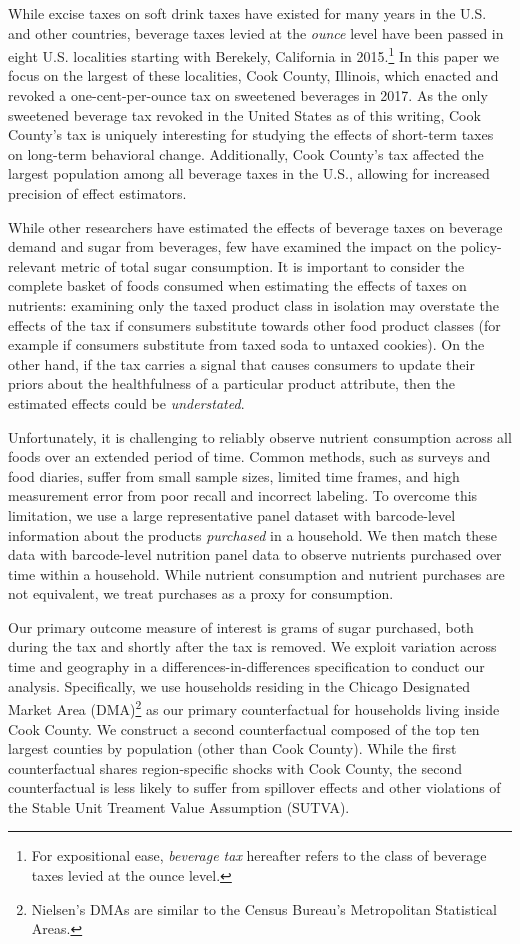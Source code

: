 \documentclass[12pt]{article}
\begin{document}
While excise taxes on soft drink taxes have existed for many years in the U.S. and other countries, beverage taxes levied at the \textit{ounce} level have been passed in eight U.S. localities starting with Berekely, California in 2015.\footnote{For expositional ease, \textit{beverage tax} hereafter refers to the class of beverage taxes levied at the ounce level.} In this paper we focus on the largest of these localities, Cook County, Illinois, which enacted and revoked a one-cent-per-ounce tax on sweetened beverages in 2017. As the only sweetened beverage tax revoked in the United States as of this writing, Cook County's tax is uniquely interesting for studying the effects of short-term taxes on long-term behavioral change. Additionally, Cook County's tax affected the largest population among all beverage taxes in the U.S., allowing for increased precision of effect estimators.

While other researchers have estimated the effects of beverage taxes on beverage demand and sugar from beverages, few have examined the impact on the policy-relevant metric of total sugar consumption. It is important to consider the complete basket of foods consumed when estimating the effects of taxes on nutrients: examining only the taxed product class in isolation may overstate the effects of the tax if consumers substitute towards other food product classes (for example if consumers substitute from taxed soda to untaxed cookies). On the other hand, if the tax carries a signal that causes consumers to update their priors about the healthfulness of a particular product attribute, then the estimated effects could be \textit{understated}.

Unfortunately, it is challenging to reliably observe nutrient consumption across all foods over an extended period of time. Common methods, such as surveys and food diaries, suffer from small sample sizes, limited time frames, and high measurement error from poor recall and incorrect labeling. To overcome this limitation, we use a large representative panel dataset with barcode-level information about the products \textit{purchased} in a household. We then match these data with barcode-level nutrition panel data to observe nutrients purchased over time within a household. While nutrient consumption and nutrient purchases are not equivalent, we treat purchases as a proxy for consumption.

Our primary outcome measure of interest is grams of sugar purchased, both during the tax and shortly after the tax is removed. We exploit variation across time and geography in a differences-in-differences specification to conduct our analysis. Specifically, we use households residing in the Chicago Designated Market Area (DMA)\footnote{Nielsen's DMAs are similar to the Census Bureau's Metropolitan Statistical Areas.} as our primary counterfactual for households living inside Cook County. We construct a second counterfactual composed of the top ten largest counties by population (other than Cook County). While the first counterfactual shares region-specific shocks with Cook County, the second counterfactual is less likely to suffer from spillover effects and other violations of the Stable Unit Treament Value Assumption (SUTVA).
\end{document}
